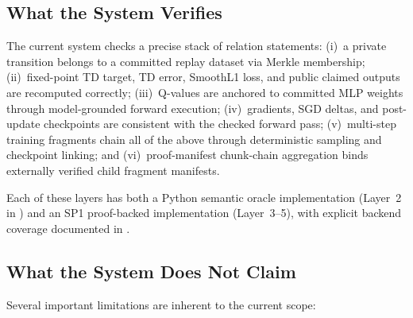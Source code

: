 
\subsection{What the System Verifies}

The current system checks a precise stack of relation statements: (i)~a
private transition belongs to a committed replay dataset via Merkle
membership; (ii)~fixed-point TD target, TD error, SmoothL1 loss, and public
claimed outputs are recomputed correctly; (iii)~Q-values are anchored to
committed MLP weights through model-grounded forward execution;
(iv)~gradients, SGD deltas, and post-update checkpoints are consistent with
the checked forward pass; (v)~multi-step training fragments chain all of the
above through deterministic sampling and checkpoint linking; and
(vi)~proof-manifest chunk-chain aggregation binds externally verified child
fragment manifests.

Each of these layers has both a Python semantic oracle implementation (Layer~2
in ) and an SP1 proof-backed implementation
(Layer~3--5), with explicit backend coverage documented in
.

\subsection{What the System Does Not Claim}

Several important limitations are inherent to the current scope:

